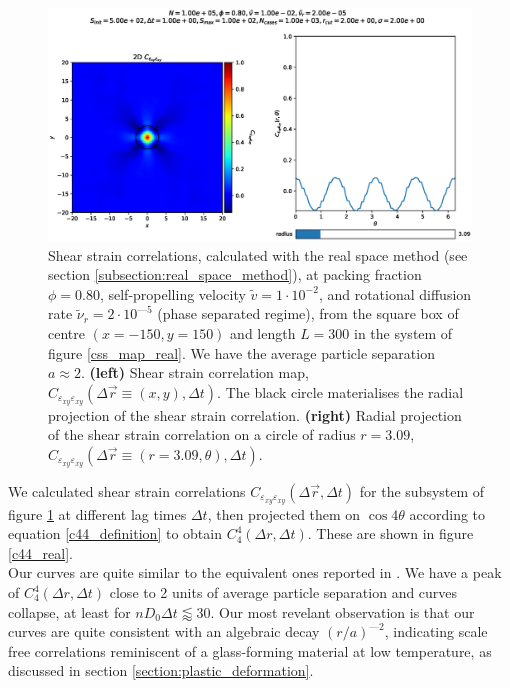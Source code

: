 \documentclass[class=report, float=false, crop=false]{standalone}
\begin{document}
\begin{figure}[H]
\centering
\includegraphics[width=\textwidth]{figures/figs/Cssb_Dk8000_Vj1000_Rg2000_Nq1000_In5000_Tl1000_Ml1000_Co1000_Bn3000_XN1500_Yn1500_grid_circle.eps}
\caption{Shear strain correlations, calculated with the real space method (see section \ref{subsection:real_space_method}), at packing fraction $\phi = 0.80$, self-propelling velocity $\tilde{v} = 1\cdot10^{-2}$, and rotational diffusion rate $\tilde{\nu}_r = 2\cdot10^{—5}$ (phase separated regime), from the square box of centre $(x=-150, y=150)$ and length $L=300$ in the system of figure \ref{css_map_real}. We have the average particle separation $a \approx 2$. \textbf{(left)} Shear strain correlation map, $C_{\varepsilon_{xy}\varepsilon_{xy}}(\Delta\vec{r} \equiv (x, y), \Delta t)$. The black circle materialises the radial projection of the shear strain correlation. \textbf{(right)} Radial projection of the shear strain correlation on a circle of radius $r=3.09$, $C_{\varepsilon_{xy}\varepsilon_{xy}}(\Delta\vec{r} \equiv (r=3.09, \theta), \Delta t)$.}
\label{css_map_real_quarter}
\end{figure}

We calculated shear strain correlations $C_{\varepsilon_{xy}\varepsilon_{xy}}(\Delta \vec{r}, \Delta t)$ for the subsystem of figure \ref{css_map_real_quarter} at different lag times $\Delta t$, then projected them on $\cos4\theta$ according to equation \ref{c44_definition} to obtain $C_4^4(\Delta r, \Delta t)$. These are shown in figure \ref{c44_real}.\\

Our curves are quite similar to the equivalent ones reported in \cite{illing2016strain, hassani2018long}. We have a peak of $C_4^4(\Delta r, \Delta t)$ close to 2 units of average particle separation and curves collapse, at least for $nD_0\Delta t \lessapprox 30$. Our most revelant observation is that our curves are quite consistent with an algebraic decay $(r/a)^{—2}$, indicating scale free correlations reminiscent of a glass-forming material at low temperature, as discussed in section \ref{section:plastic_deformation}.\\
\end{document}
